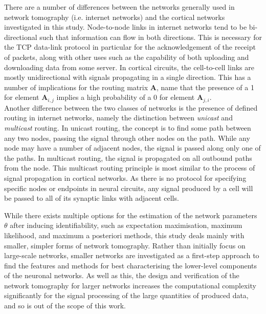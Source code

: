 \par

There are a number of differences between the networks generally used in network tomography (i.e. internet networks) and the cortical networks investigated in this study. Node-to-node links in internet networks tend to be bi-directional such that information can flow in both directions. This is necessary for the TCP data-link protocol in particular for the acknowledgement of the receipt of packets, along with other uses such as the capability of both uploading and downloading data from some server. In cortical circuits, the cell-to-cell links are mostly unidirectional with signals propagating in a single direction. This has a number of implications for the routing matrix $\boldsymbol{A}$, name that the presence of a 1 for element $\boldsymbol{A}_{i,j}$ implies a high probability of a 0 for element $\boldsymbol{A}_{j,i}$.\\
Another difference between the two classes of networks is the presence of defined routing in internet networks, namely the distinction between \emph{unicast} and \emph{multicast} routing. In unicast routing, the concept is to find some path between any two nodes, passing the signal through other nodes on the path. While any node may have a number of adjacent nodes, the signal is passed along only one of the paths. In multicast routing, the signal is propagated on all outbound paths from the node. This multicast routing principle is most similar to the process of signal propagation in cortical networks. As there is no protocol for specifying specific nodes or endpoints in neural circuits, any signal produced by a cell will be passed to all of its synaptic links with adjacent cells. 

\par

While there exists multiple options for the estimation of the network parameters $\theta$ after inducing identifiability, such as expectation maximisation, maximum likelihood, and maximum a posteriori methods, this study deals mainly with smaller, simpler forms of network tomography. Rather than initially focus on large-scale networks, smaller networks are investigated as a first-step approach to find the features and methods for best characterising the lower-level components of the neuronal networks. As well as this, the design and verification of the network tomography for larger networks increases the computational complexity significantly for the signal processing of the large quantities of produced data, and so is out of the scope of this work.

